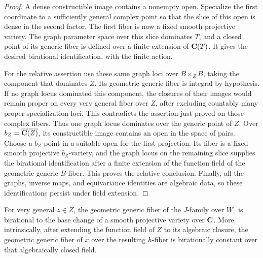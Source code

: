 \begin{proof}
A dense constructible image contains a nonempty open.  Specialize the
first coordinate to a sufficiently general complex point so that the
slice of this open is dense in the second factor.  The first fiber is
now a fixed smooth projective variety.  The graph parameter space over
this slice dominates $T$, and a closed point of its generic fiber is
defined over a finite extension of $\mathbf C(T)$.  It gives the desired
birational identification, with the finite action.

For the relative assertion use these same graph loci over
$B\times_Z B$, taking the component that dominates $Z$.  Its geometric
generic fiber is integral by hypothesis.  If no graph locus dominated
this component, the closures of their images would remain proper on
every very general fiber over $Z$, after excluding countably many
proper specialization loci.  This contradicts the assertion just
proved on those complex fibers.  Thus one graph locus dominates over
the generic point of $Z$.  Over $b_Z=\overline{\mathbf C(Z)}$, its
constructible image contains an open in the space of pairs.  Choose a
$b_Z$-point in a suitable open for the first projection.  Its fiber is
a fixed smooth projective $b_Z$-variety, and the graph locus on the
remaining slice supplies the birational identification after a finite
extension of the function field of the geometric generic $B$-fiber.
This proves the relative conclusion.  Finally, all the graphs, inverse
maps, and equivariance identities are algebraic data, so these
identifications persist under field extension.
\end{proof}

\begin{proposition}
\label{ro:constancy}
For very general $z\in Z$, the geometric generic fiber of the
$J$-family over $W_z$ is birational to the base change of a smooth
projective variety over $\mathbf C$.  More intrinsically, after extending the
function field of $Z$ to its algebraic closure, the geometric generic
fiber of $x$ over the resulting $h$-fiber is birationally constant over
that algebraically closed field.
\end{proposition}

